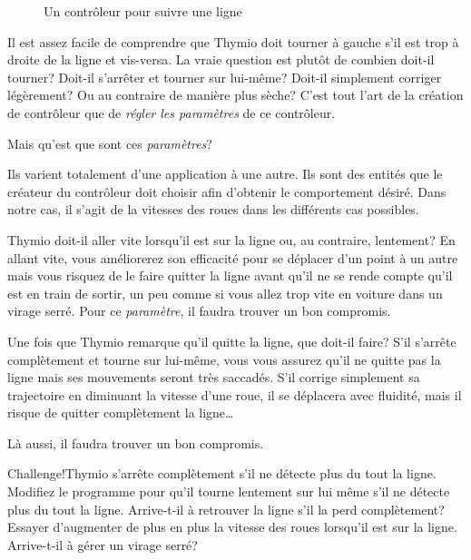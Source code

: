 \begin{figure}[h]
    \centering
    \hspace{1cm}
    \caption{Un contrôleur pour suivre une ligne}
\end{figure}


Il est assez facile de comprendre que Thymio doit tourner à gauche s'il est trop à droite de la ligne et vis-versa. La vraie question est plutôt de combien doit-il tourner? Doit-il s'arrêter et tourner sur lui-même? Doit-il simplement corriger légèrement? Ou au contraire de manière plus sèche? C'est tout l'art de la création de contrôleur que de \textit{régler les paramètres} de ce contrôleur.

Mais qu'est que sont ces \textit{paramètres}?

Ils varient totalement d'une application à une autre. Ils sont des entités que le créateur du contrôleur doit choisir afin d'obtenir le comportement désiré. Dans notre cas, il s'agit de la vitesses des roues dans les différents cas possibles. 

Thymio doit-il aller vite lorsqu'il est sur la ligne ou, au contraire, lentement? En allant vite, vous améliorerez son efficacité pour se déplacer d'un point à un autre mais vous risquez de le faire quitter la ligne avant qu'il ne se rende compte qu'il est en train de sortir, un peu comme si vous allez trop vite en voiture dans un virage serré. Pour ce \textit{paramètre}, il faudra trouver un bon compromis.

Une fois que Thymio remarque qu'il quitte la ligne, que doit-il faire? S'il s'arrête complètement et tourne sur lui-même, vous vous assurez qu'il ne quitte pas la ligne mais ses mouvements seront très saccadés. S'il corrige simplement sa trajectoire en diminuant la vitesse d'une roue, il se déplacera avec fluidité, mais il risque de quitter complètement la ligne\ldots 

Là aussi, il faudra trouver un bon compromis.

\begin{bclogo}[couleur = pink!30, arrondi = 0.1, logo = \bccrayon, ombre = true]{Challenge!}Thymio s'arrête complètement s'il ne détecte plus du tout la ligne. Modifiez le programme pour qu'il tourne lentement sur lui même s'il ne détecte plus du tout la ligne. Arrive-t-il à retrouver la ligne s'il la perd complètement? Essayer d'augmenter de plus en plus la vitesse des roues lorsqu'il est sur la ligne. Arrive-t-il à gérer un virage serré?
\end{bclogo}


